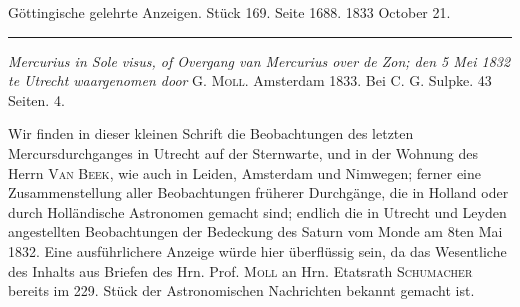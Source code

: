 \par\medskip
{}
\hypertarget{native-653-lower}{}
\begin{center}\small Göttingische gelehrte Anzeigen. Stück 169. Seite 1688. 1833 October 21.\\[3pt]\rule{.72\linewidth}{.3pt}\end{center}

\emph{Mercurius in Sole visus, of Overgang van Mercurius over de Zon; den 5 Mei \textup{1832} te Utrecht waargenomen door} G. \textsc{Moll}. Amsterdam 1833. Bei C. G. Sulpke. 43 Seiten. 4.

Wir finden in dieser kleinen Schrift die Beobachtungen des letzten Mercursdurchganges in Utrecht auf der Sternwarte, und in der Wohnung des Herrn \textsc{Van Beek}, wie auch in Leiden, Amsterdam und Nimwegen; ferner eine Zusammenstellung aller Beobachtungen früherer Durchgänge, die in Holland oder durch Holländische Astronomen gemacht sind; endlich die in Utrecht und Leyden angestellten Beobachtungen der Bedeckung des Saturn vom Monde am 8ten Mai 1832. Eine ausführlichere Anzeige würde hier überflüssig sein, da das Wesentliche des Inhalts aus Briefen des Hrn. Prof. \textsc{Moll} an Hrn. Etatsrath \textsc{Schumacher} bereits im 229. Stück der Astronomischen Nachrichten bekannt gemacht ist.
\par\clearpage\endgroup
